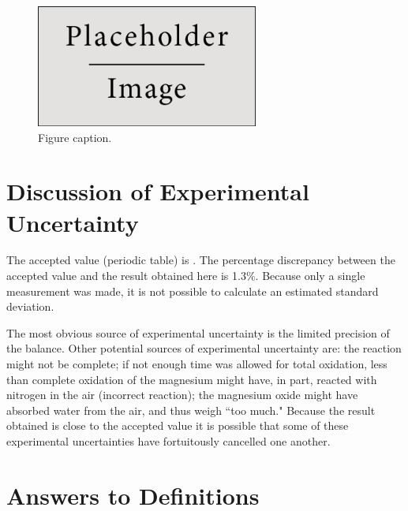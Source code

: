 \documentclass{article}
\begin{document}
\begin{figure}[h]
\begin{center}
\includegraphics[width=0.65\textwidth]{placeholder} %
\caption{Figure caption.}
\end{center}
\end{figure}


\section{Discussion of Experimental Uncertainty}

The accepted value (periodic table) is  \cite{Smith:2012qr}. The percentage discrepancy between the accepted value and the result obtained here is 1.3\%. Because only a single measurement was made, it is not possible to calculate an estimated standard deviation.

The most obvious source of experimental uncertainty is the limited precision of the balance. Other potential sources of experimental uncertainty are: the reaction might not be complete; if not enough time was allowed for total oxidation, less than complete oxidation of the magnesium might have, in part, reacted with nitrogen in the air (incorrect reaction); the magnesium oxide might have absorbed water from the air, and thus weigh ``too much." Because the result obtained is close to the accepted value it is possible that some of these experimental uncertainties have fortuitously cancelled one another.


\section{Answers to Definitions}
\end{document}
